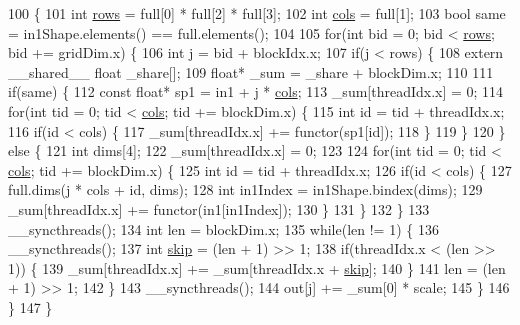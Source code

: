 \begin{DoxyCode}
100                                            \{
101   \textcolor{keywordtype}{int} \hyperlink{namespacemarian_ace1e9a63d52edc363d70d661cf8d0257}{rows} = full[0] * full[2] * full[3];
102   \textcolor{keywordtype}{int} \hyperlink{namespacemarian_ab9fbdcc76cc853270094524572584222}{cols} = full[1];
103   \textcolor{keywordtype}{bool} same = in1Shape.elements() == full.elements();
104 
105   \textcolor{keywordflow}{for}(\textcolor{keywordtype}{int} bid = 0; bid < \hyperlink{namespacemarian_ace1e9a63d52edc363d70d661cf8d0257}{rows}; bid += gridDim.x) \{
106     \textcolor{keywordtype}{int} j = bid + blockIdx.x;
107     \textcolor{keywordflow}{if}(j < rows) \{
108       \textcolor{keyword}{extern} \_\_shared\_\_ \textcolor{keywordtype}{float} \_share[];
109       \textcolor{keywordtype}{float}* \_sum = \_share + blockDim.x;
110 
111       \textcolor{keywordflow}{if}(same) \{
112         \textcolor{keyword}{const} \textcolor{keywordtype}{float}* sp1 = in1 + j * \hyperlink{namespacemarian_ab9fbdcc76cc853270094524572584222}{cols};
113         \_sum[threadIdx.x] = 0;
114         \textcolor{keywordflow}{for}(\textcolor{keywordtype}{int} tid = 0; tid < \hyperlink{namespacemarian_ab9fbdcc76cc853270094524572584222}{cols}; tid += blockDim.x) \{
115           \textcolor{keywordtype}{int} \textcolor{keywordtype}{id} = tid + threadIdx.x;
116           \textcolor{keywordflow}{if}(\textcolor{keywordtype}{id} < cols) \{
117             \_sum[threadIdx.x] += functor(sp1[\textcolor{keywordtype}{id}]);
118           \}
119         \}
120       \} \textcolor{keywordflow}{else} \{
121         \textcolor{keywordtype}{int} dims[4];
122         \_sum[threadIdx.x] = 0;
123 
124         \textcolor{keywordflow}{for}(\textcolor{keywordtype}{int} tid = 0; tid < \hyperlink{namespacemarian_ab9fbdcc76cc853270094524572584222}{cols}; tid += blockDim.x) \{
125           \textcolor{keywordtype}{int} \textcolor{keywordtype}{id} = tid + threadIdx.x;
126           \textcolor{keywordflow}{if}(\textcolor{keywordtype}{id} < cols) \{
127             full.dims(j * cols + \textcolor{keywordtype}{id}, dims);
128             \textcolor{keywordtype}{int} in1Index = in1Shape.bindex(dims);
129             \_sum[threadIdx.x] += functor(in1[in1Index]);
130           \}
131         \}
132       \}
133       \_\_syncthreads();
134       \textcolor{keywordtype}{int} len = blockDim.x;
135       \textcolor{keywordflow}{while}(len != 1) \{
136         \_\_syncthreads();
137         \textcolor{keywordtype}{int} \hyperlink{namespacemarian_1_1keywords_afbbd32f06a85a40050d9fd36a50d8ea4}{skip} = (len + 1) >> 1;
138         \textcolor{keywordflow}{if}(threadIdx.x < (len >> 1)) \{
139           \_sum[threadIdx.x] += \_sum[threadIdx.x + \hyperlink{namespacemarian_1_1keywords_afbbd32f06a85a40050d9fd36a50d8ea4}{skip}];
140         \}
141         len = (len + 1) >> 1;
142       \}
143       \_\_syncthreads();
144       out[j] += \_sum[0] * scale;
145     \}
146   \}
147 \}
\end{DoxyCode}


